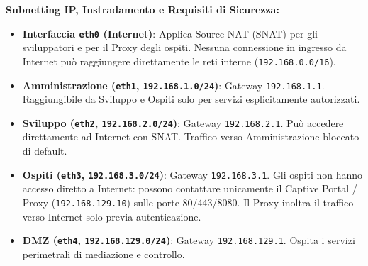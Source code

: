 \documentclass[11pt,a4paper]{article}
\begin{document}
\begin{solutionbox}
\textbf{Subnetting IP, Instradamento e Requisiti di Sicurezza:}
\begin{itemize}
    \item \textbf{Interfaccia \texttt{eth0} (Internet)}: Applica Source NAT (SNAT) per gli sviluppatori e per il Proxy degli ospiti. Nessuna connessione in ingresso da Internet pu\`o raggiungere direttamente le reti interne (\texttt{192.168.0.0/16}).
    \item \textbf{Amministrazione (\texttt{eth1}, \texttt{192.168.1.0/24})}: Gateway \texttt{192.168.1.1}. Raggiungibile da Sviluppo e Ospiti solo per servizi esplicitamente autorizzati.
    \item \textbf{Sviluppo (\texttt{eth2}, \texttt{192.168.2.0/24})}: Gateway \texttt{192.168.2.1}. Pu\`o accedere direttamente ad Internet con SNAT. Traffico verso Amministrazione bloccato di default.
    \item \textbf{Ospiti (\texttt{eth3}, \texttt{192.168.3.0/24})}: Gateway \texttt{192.168.3.1}. Gli ospiti non hanno accesso diretto a Internet: possono contattare unicamente il Captive Portal / Proxy (\texttt{192.168.129.10}) sulle porte 80/443/8080. Il Proxy inoltra il traffico verso Internet solo previa autenticazione.
    \item \textbf{DMZ (\texttt{eth4}, \texttt{192.168.129.0/24})}: Gateway \texttt{192.168.129.1}. Ospita i servizi perimetrali di mediazione e controllo.
\end{itemize}


\end{solutionbox}
\end{document}
